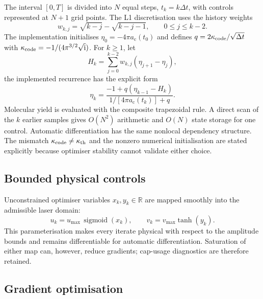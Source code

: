 \documentclass[9pt,a4paper,twocolumn,twoside]{rho-class/rho}
\newcommand{\ac}{a_{\mathrm{c}}}
\newcommand{\ii}{\mathrm{i}}
\begin{document}
        The interval $[0,T]$ is divided into $N$ equal steps, $t_k=k\Delta t$, with controls represented at $N+1$ grid points. The L1 discretisation uses the history weights
        \begin{equation}\label{eq:l1-weights}
            w_{k,j}=\sqrt{k-j}-\sqrt{k-j-1},
            \qquad 0\leq j\leq k-2.
        \end{equation}
        The implementation initialises
        $\eta_0=-4\pi\ac(t_0)$ and defines
        $q=2\kappa_{\rm code}/\sqrt{\Delta t}$ with
        $\kappa_{\rm code}=-1/(4\pi^{3/2}\sqrt{\ii})$. For $k\geq1$, let
        \begin{equation}\label{eq:l1-history}
            H_k=\sum_{j=0}^{k-2}w_{k,j}(\eta_{j+1}-\eta_j),
        \end{equation}
        the implemented recurrence has the explicit form
        \begin{equation}\label{eq:l1-update}
            \eta_k=
            \frac{-1+q(\eta_{k-1}-H_k)}
            {1/[4\pi\ac(t_k)]+q}.
        \end{equation}
        Molecular yield is evaluated with the composite trapezoidal rule. A
        direct scan of the $k$ earlier samples gives $O(N^2)$ arithmetic and
        $O(N)$ state storage for one control. Automatic differentiation has the
        same nonlocal dependency structure. The mismatch
        $\kappa_{\rm code}\ne\kappa_{\rm th}$ and the nonzero numerical
        initialisation are stated explicitly because optimiser stability cannot
        validate either choice.

    \subsection{Bounded physical controls}

        Unconstrained optimiser variables $x_k,y_k\in\mathbb{R}$ are mapped smoothly into the admissible laser domain:
        \begin{equation}\label{eq:bounded-map}
            u_k=u_{\max}\,\operatorname{sigmoid}(x_k),\qquad
            v_k=v_{\max}\tanh(y_k).
        \end{equation}
        This parameterisation makes every iterate physical with respect to the amplitude bounds and remains differentiable for automatic differentiation. Saturation of either map can, however, reduce gradients; cap-usage diagnostics are therefore retained.

    \subsection{Gradient optimisation}
\end{document}
